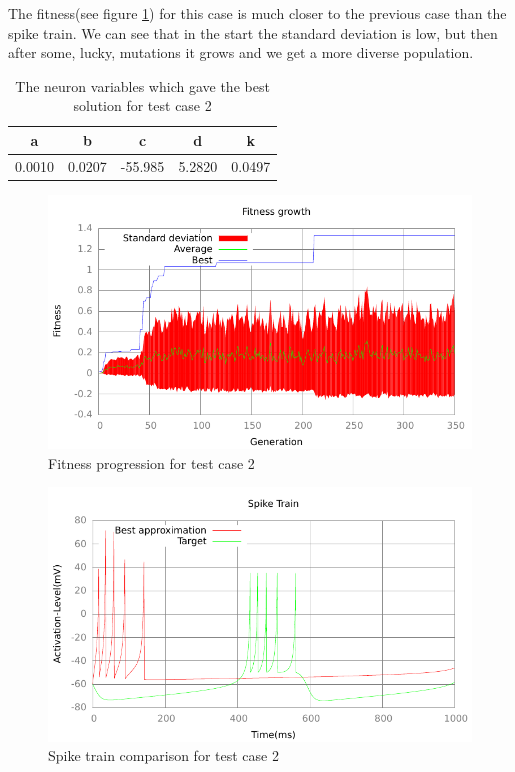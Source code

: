 The fitness(see figure \ref{fig:fitness-test-case-2}) for this case is much 
closer to the previous case than the spike
train. We can see that in the start the standard deviation is low, but then
after some, lucky, mutations it grows and we get a more diverse population.
\begin{table}
	\begin{tabular}{c c c c c}
		a & b & c & d & k \\
		\hline
		0.0010 & 0.0207 & -55.985 & 5.2820 & 0.0497
	\end{tabular}
	\caption{The neuron variables which gave the best solution for test case
	2}
\end{table}
\begin{figure}[h]
	\centering
	\includegraphics{../output/sidm_izzy_1_fitness.pdf}
	\caption{Fitness progression for test case 2}
	\label{fig:fitness-test-case-2}
\end{figure}
\begin{figure}[h]
	\centering
	\includegraphics{../output/sidm_izzy_1_spike.pdf}
	\caption{Spike train comparison for test case 2}
	\label{fig:spike-test-case-2}
\end{figure}

